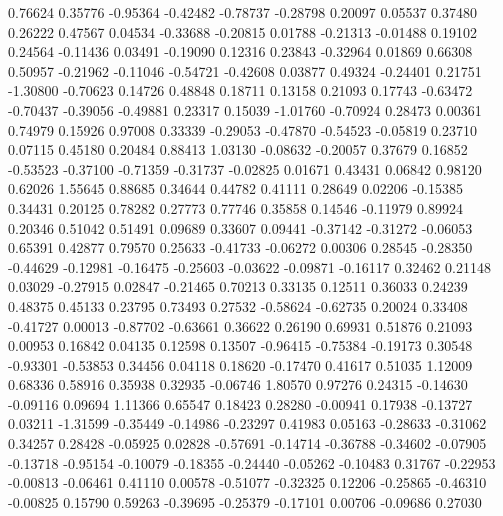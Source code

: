    0.76624  0.35776
  -0.95364 -0.42482
  -0.78737 -0.28798
   0.20097  0.05537
   0.37480  0.26222
   0.47567  0.04534
  -0.33688 -0.20815
   0.01788 -0.21313
  -0.01488  0.19102
   0.24564 -0.11436
   0.03491 -0.19090
   0.12316  0.23843
  -0.32964  0.01869
   0.66308  0.50957
  -0.21962 -0.11046
  -0.54721 -0.42608
   0.03877  0.49324
  -0.24401  0.21751
  -1.30800 -0.70623
   0.14726  0.48848
   0.18711  0.13158
   0.21093  0.17743
  -0.63472 -0.70437
  -0.39056 -0.49881
   0.23317  0.15039
  -1.01760 -0.70924
   0.28473  0.00361
   0.74979  0.15926
   0.97008  0.33339
  -0.29053 -0.47870
  -0.54523 -0.05819
   0.23710  0.07115
   0.45180  0.20484
   0.88413  1.03130
  -0.08632 -0.20057
   0.37679  0.16852
  -0.53523 -0.37100
  -0.71359 -0.31737
  -0.02825  0.01671
   0.43431  0.06842
   0.98120  0.62026
   1.55645  0.88685
   0.34644  0.44782
   0.41111  0.28649
   0.02206 -0.15385
   0.34431  0.20125
   0.78282  0.27773
   0.77746  0.35858
   0.14546 -0.11979
   0.89924  0.20346
   0.51042  0.51491
   0.09689  0.33607
   0.09441 -0.37142
  -0.31272 -0.06053
   0.65391  0.42877
   0.79570  0.25633
  -0.41733 -0.06272
   0.00306  0.28545
  -0.28350 -0.44629
  -0.12981 -0.16475
  -0.25603 -0.03622
  -0.09871 -0.16117
   0.32462  0.21148
   0.03029 -0.27915
   0.02847 -0.21465
   0.70213  0.33135
   0.12511  0.36033
   0.24239  0.48375
   0.45133  0.23795
   0.73493  0.27532
  -0.58624 -0.62735
   0.20024  0.33408
  -0.41727  0.00013
  -0.87702 -0.63661
   0.36622  0.26190
   0.69931  0.51876
   0.21093  0.00953
   0.16842  0.04135
   0.12598  0.13507
  -0.96415 -0.75384
  -0.19173  0.30548
  -0.93301 -0.53853
   0.34456  0.04118
   0.18620 -0.17470
   0.41617  0.51035
   1.12009  0.68336
   0.58916  0.35938
   0.32935 -0.06746
   1.80570  0.97276
   0.24315 -0.14630
  -0.09116  0.09694
   1.11366  0.65547
   0.18423  0.28280
  -0.00941  0.17938
  -0.13727  0.03211
  -1.31599 -0.35449
  -0.14986 -0.23297
   0.41983  0.05163
  -0.28633 -0.31062
   0.34257  0.28428
  -0.05925  0.02828
  -0.57691 -0.14714
  -0.36788 -0.34602
  -0.07905 -0.13718
  -0.95154 -0.10079
  -0.18355 -0.24440
  -0.05262 -0.10483
   0.31767 -0.22953
  -0.00813 -0.06461
   0.41110  0.00578
  -0.51077 -0.32325
   0.12206 -0.25865
  -0.46310 -0.00825
   0.15790  0.59263
  -0.39695 -0.25379
  -0.17101  0.00706
  -0.09686  0.27030

